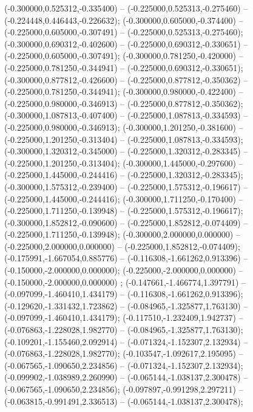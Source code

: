  (-0.300000,0.525312,-0.335400) -- (-0.225000,0.525313,-0.275460) -- (-0.224448,0.446443,-0.226632);
 (-0.300000,0.605000,-0.374400) -- (-0.225000,0.605000,-0.307491) -- (-0.225000,0.525313,-0.275460);
 (-0.300000,0.690312,-0.402600) -- (-0.225000,0.690312,-0.330651) -- (-0.225000,0.605000,-0.307491);
 (-0.300000,0.781250,-0.420000) -- (-0.225000,0.781250,-0.344941) -- (-0.225000,0.690312,-0.330651);
 (-0.300000,0.877812,-0.426600) -- (-0.225000,0.877812,-0.350362) -- (-0.225000,0.781250,-0.344941);
 (-0.300000,0.980000,-0.422400) -- (-0.225000,0.980000,-0.346913) -- (-0.225000,0.877812,-0.350362);
 (-0.300000,1.087813,-0.407400) -- (-0.225000,1.087813,-0.334593) -- (-0.225000,0.980000,-0.346913);
 (-0.300000,1.201250,-0.381600) -- (-0.225000,1.201250,-0.313404) -- (-0.225000,1.087813,-0.334593);
 (-0.300000,1.320312,-0.345000) -- (-0.225000,1.320312,-0.283345) -- (-0.225000,1.201250,-0.313404);
 (-0.300000,1.445000,-0.297600) -- (-0.225000,1.445000,-0.244416) -- (-0.225000,1.320312,-0.283345);
 (-0.300000,1.575312,-0.239400) -- (-0.225000,1.575312,-0.196617) -- (-0.225000,1.445000,-0.244416);
 (-0.300000,1.711250,-0.170400) -- (-0.225000,1.711250,-0.139948) -- (-0.225000,1.575312,-0.196617);
 (-0.300000,1.852812,-0.090600) -- (-0.225000,1.852812,-0.074409) -- (-0.225000,1.711250,-0.139948);
 (-0.300000,2.000000,0.000000) -- (-0.225000,2.000000,0.000000) -- (-0.225000,1.852812,-0.074409);
 (-0.175991,-1.667054,0.885776) -- (-0.116308,-1.661262,0.913396) -- (-0.150000,-2.000000,0.000000);
 (-0.225000,-2.000000,0.000000) -- (-0.150000,-2.000000,0.000000) ;
 (-0.147661,-1.466774,1.397791) -- (-0.097099,-1.460410,1.434179) -- (-0.116308,-1.661262,0.913396);
 (-0.129620,-1.331432,1.723862) -- (-0.084965,-1.325877,1.763130) -- (-0.097099,-1.460410,1.434179);
 (-0.117510,-1.232409,1.942737) -- (-0.076863,-1.228028,1.982770) -- (-0.084965,-1.325877,1.763130);
 (-0.109201,-1.155460,2.092914) -- (-0.071324,-1.152307,2.132934) -- (-0.076863,-1.228028,1.982770);
 (-0.103547,-1.092617,2.195095) -- (-0.067565,-1.090650,2.234856) -- (-0.071324,-1.152307,2.132934);
 (-0.099902,-1.038989,2.260990) -- (-0.065144,-1.038137,2.300478) -- (-0.067565,-1.090650,2.234856);
 (-0.097897,-0.991298,2.297211) -- (-0.063815,-0.991491,2.336513) -- (-0.065144,-1.038137,2.300478);
